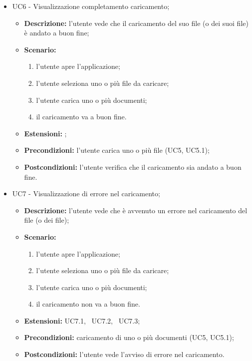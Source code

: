 \documentclass[10pt, a4paper]{article}
\begin{document}
\begin{itemize}
    \item UC6 - Visualizzazione completamento caricamento;
    \begin{itemize}
        \item \textbf{Descrizione: }l'utente vede che il caricamento del suo file (o dei suoi file) è andato a buon fine;
        \item \textbf{Scenario: }
        \begin{enumerate}[label={\arabic*.}, align=left]
        \item l'utente apre l'applicazione;
        \item l'utente seleziona uno o più file da caricare;
        \item l'utente carica uno o più documenti;
        \item il caricamento va a buon fine.
        \end{enumerate}
        \item \textbf{Estensioni: };
        \item \textbf{Precondizioni:} l'utente carica uno o più file (UC5, UC5.1);
        \item \textbf{Postcondizioni:} l'utente verifica che il caricamento sia andato a buon fine.\\
    \end{itemize}
    
    \item UC7 - Visualizzazione di errore nel caricamento;
    \begin{itemize}
        \item \textbf{Descrizione: }l'utente vede che è avvenuto un errore nel caricamento del file (o dei file);
        \item \textbf{Scenario: }
        \begin{enumerate}[label={\arabic*.}, align=left]
        \item l'utente apre l'applicazione;
        \item l'utente seleziona uno o più file da caricare;
        \item l'utente carica uno o più documenti;
        \item il caricamento non va a buon fine.
        \end{enumerate}
        \item \textbf{Estensioni: }UC7.1, \ UC7.2, \ UC7.3;
        \item \textbf{Precondizioni:} caricamento di uno o più documenti (UC5, UC5.1);
        \item \textbf{Postcondizioni:} l'utente vede l'avviso di errore nel caricamento.
    \end{itemize}
    

\end{itemize}
\end{document}

